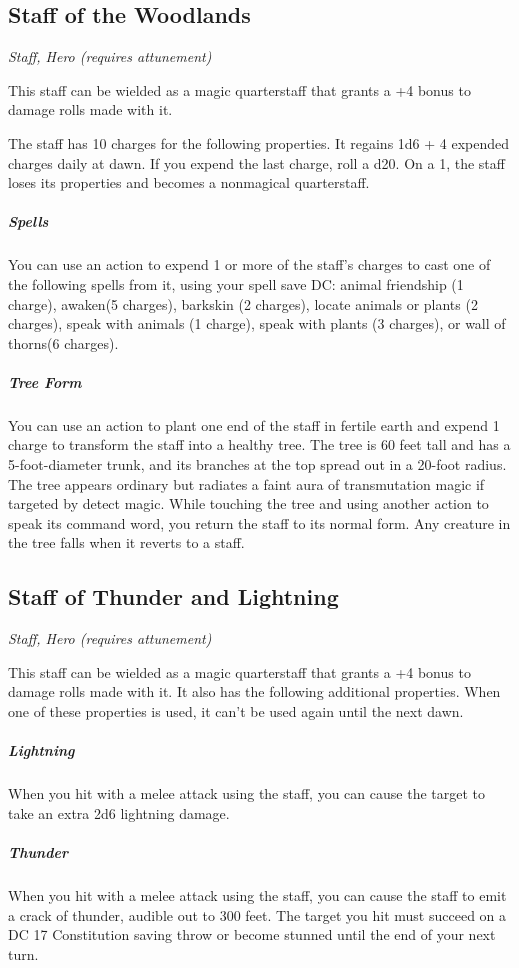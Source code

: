 \subsection{Staff of the Woodlands}
\textit{Staff, Hero (requires attunement)}

This staff can be wielded as a magic quarterstaff that grants a +4 bonus to damage rolls made with it.

The staff has 10 charges for the following properties. It regains 1d6 + 4 expended charges daily at dawn. If you expend the last charge, roll a d20. On a 1, the staff loses its properties and becomes a nonmagical quarterstaff.

\subparagraph*{Spells} You can use an action to expend 1 or more of the staff's charges to cast one of the following spells from it, using your spell save DC: animal friendship (1 charge), awaken(5 charges), barkskin (2 charges), locate animals or plants (2 charges), speak with animals (1 charge), speak with plants (3 charges), or wall of thorns(6 charges).

\subparagraph*{Tree Form} You can use an action to plant one end of the staff in fertile earth and expend 1 charge to transform the staff into a healthy tree. The tree is 60 feet tall and has a 5-foot-diameter trunk, and its branches at the top spread out in a 20-foot radius. The tree appears ordinary but radiates a faint aura of transmutation magic if targeted by detect magic. While touching the tree and using another action to speak its command word, you return the staff to its normal form. Any creature in the tree falls when it reverts to a staff.

\subsection{Staff of Thunder and Lightning}
\textit{Staff, Hero (requires attunement)}

This staff can be wielded as a magic quarterstaff that grants a +4 bonus to damage rolls made with it. It also has the following additional properties. When one of these properties is used, it can't be used again until the next dawn.

\subparagraph*{Lightning} When you hit with a melee attack using the staff, you can cause the target to take an extra 2d6 lightning damage.

\subparagraph*{Thunder} When you hit with a melee attack using the staff, you can cause the staff to emit a crack of thunder, audible out to 300 feet. The target you hit must succeed on a DC 17 Constitution saving throw or become stunned until the end of your next turn.

